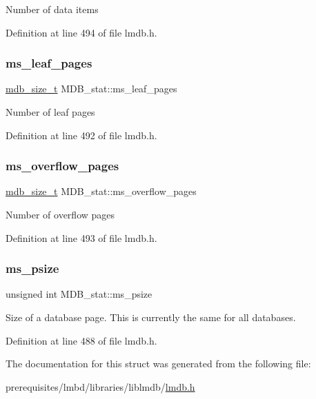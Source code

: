 Number of data items 

Definition at line 494 of file lmdb.\+h.

\mbox{\label{struct_m_d_b__stat_abbcde1ee2a6131f5c815c41dd75f8ce8}} 
\subsubsection{\texorpdfstring{ms\+\_\+leaf\+\_\+pages}{ms\_leaf\_pages}}
{\footnotesize\ttfamily \mbox{\hyperlink{lmdb_8h_a78821971e612e3898ef4b3ae45ed86f1}{mdb\+\_\+size\+\_\+t}} M\+D\+B\+\_\+stat\+::ms\+\_\+leaf\+\_\+pages}

Number of leaf pages 

Definition at line 492 of file lmdb.\+h.

\mbox{\label{struct_m_d_b__stat_afa3924f9dc1241ba89c117b4c0d189ca}} 
\subsubsection{\texorpdfstring{ms\+\_\+overflow\+\_\+pages}{ms\_overflow\_pages}}
{\footnotesize\ttfamily \mbox{\hyperlink{lmdb_8h_a78821971e612e3898ef4b3ae45ed86f1}{mdb\+\_\+size\+\_\+t}} M\+D\+B\+\_\+stat\+::ms\+\_\+overflow\+\_\+pages}

Number of overflow pages 

Definition at line 493 of file lmdb.\+h.

\mbox{\label{struct_m_d_b__stat_a770440a4f2dec8592ae8f86c80895516}} 
\subsubsection{\texorpdfstring{ms\+\_\+psize}{ms\_psize}}
{\footnotesize\ttfamily unsigned int M\+D\+B\+\_\+stat\+::ms\+\_\+psize}

Size of a database page. This is currently the same for all databases. 

Definition at line 488 of file lmdb.\+h.



The documentation for this struct was generated from the following file\+:\begin{DoxyCompactItemize}
\item 
prerequisites/lmbd/libraries/liblmdb/\mbox{\hyperlink{lmdb_8h}{lmdb.\+h}}\end{DoxyCompactItemize}

